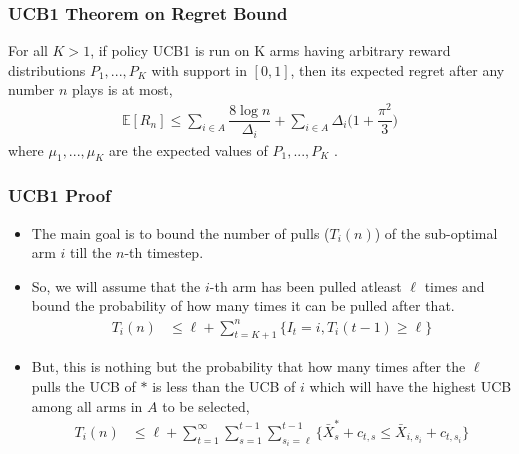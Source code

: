 \begin{frame}
\frametitle{UCB1 Theorem on Regret Bound}
\begin{theorem}
For all $K > 1$, if policy UCB1 is run on K arms having arbitrary reward
distributions $P_{1}, . . . , P_{K}$ with support in $[0, 1]$, then its expected regret after any number $n$ plays is at most,
\begin{align*}
\mathbb{E}[R_n]\leq \sum_{i\in A}\dfrac{8\log n}{\Delta_{i}} + \sum_{i\in A}\Delta_{i}\bigg(1+\dfrac{\pi^{2}}{3}\bigg) 
\end{align*}
where $\mu_{1}, . . . , \mu_{K}$ are the expected values of $P_{1}, . . . , P_{K}$ .
\end{theorem}
\end{frame}

\begin{frame}
\frametitle{UCB1 Proof}
\begin{itemize}
\item<1-> The main goal is to bound the number of pulls ($T_i(n)$) of the sub-optimal arm $i$ till the $n$-th timestep.
\item<2-> So, we will assume that the $i$-th arm has been pulled atleast $\ell$ times and bound the probability of how many times it can be pulled after that.
\begin{align*}
T_{i}(n)&\leq \ell +\sum_{t=K+1}^{n}\lbrace I_t=i, T_i(t-1)\geq \ell\rbrace
\end{align*}
\item<3-> But, this is nothing but the probability that how many times after the $\ell$ pulls the UCB of $*$ is less than the UCB of $i$ which will have the highest UCB among all arms in $A$ to be selected,
\begin{align*}
T_{i}(n)&\leq \ell + \sum_{t=1}^{\infty}\sum_{s=1}^{t-1}\sum_{s_i =\ell}^{t-1}\lbrace \bar{X}_{s}^{*} + c_{t,s} \leq \bar{X}_{i,s_i} + c_{t,s_i} \rbrace
\end{align*}
\end{itemize}
\end{frame}

